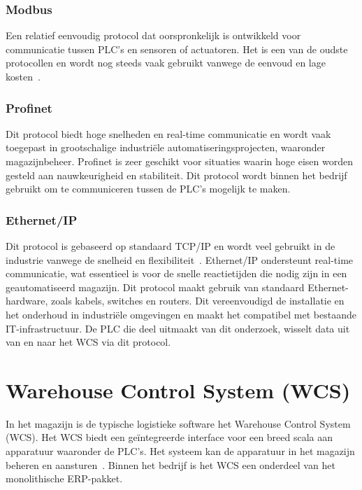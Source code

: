 \subsubsection{Modbus}
Een relatief eenvoudig protocol dat oorspronkelijk is ontwikkeld voor communicatie tussen PLC’s en sensoren of actuatoren. 
Het is een van de oudste protocollen en wordt nog steeds vaak gebruikt vanwege de eenvoud en lage kosten~\autocite{Joshi2024}. 

\subsubsection{Profinet}
Dit protocol biedt hoge snelheden en real-time communicatie 
en wordt vaak toegepast in grootschalige industriële automatiseringsprojecten, waaronder magazijnbeheer. 
Profinet is zeer geschikt voor situaties waarin hoge eisen worden gesteld aan nauwkeurigheid en stabiliteit.
Dit protocol wordt binnen het bedrijf gebruikt om te communiceren tussen de PLC's mogelijk te maken.

\subsubsection{Ethernet/IP}
Dit protocol is gebaseerd op standaard TCP/IP en wordt veel gebruikt in de industrie vanwege de snelheid en flexibiliteit~\autocite{Joshi2024}. 
Ethernet/IP ondersteunt real-time communicatie, wat essentieel is voor de snelle reactietijden die nodig zijn in een geautomatiseerd magazijn.
Dit protocol maakt gebruik van standaard Ethernet-hardware, zoals kabels, switches en routers. 
Dit vereenvoudigd de installatie en het onderhoud in industriële omgevingen en maakt het compatibel met bestaande IT-infrastructuur.
De PLC die deel uitmaakt van dit onderzoek, wisselt data uit van en naar het WCS via dit protocol.

\section{Warehouse Control System (WCS)} 
In het magazijn is de typische logistieke software het Warehouse Control System (WCS). 
Het WCS biedt een geïntegreerde interface voor een breed scala aan apparatuur waaronder de PLC's. 
Het systeem kan de apparatuur in het magazijn beheren en aansturen~\autocite{Son2015}. 
Binnen het bedrijf is het WCS een onderdeel van het monolithische ERP-pakket.

